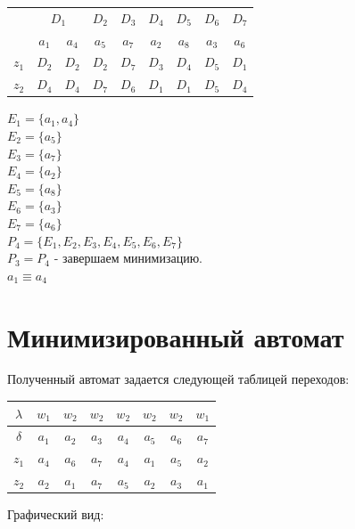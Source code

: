 \documentclass[12pt, a4paper]{article}
\begin{document}
\begin{tabular}{| c | c | c | c | c | c | c | c | c |}
  \hline
  \multirow{2}{*}{} & \multicolumn{2}{|c|}{$D_1$} & $D_2$ & $D_3$ & $D_4$ & $D_5$ & $D_6$ & $D_7$\\
  \cline{2-9}
  & $a_1$ & $a_4$ & $a_5$ & $a_7$ & $a_2$ & $a_8$ & $a_3$ & $a_6$\\
  \hline
  $z_1$ & $D_2$ & $D_2$ & $D_2$ & $D_7$ & $D_3$ & $D_4$ & $D_5$ & $D_1$\\
  \hline
  $z_2$ & $D_4$ & $D_4$ & $D_7$ & $D_6$ & $D_1$ & $D_1$ & $D_5$ & $D_4$\\
  \hline
\end{tabular}

\noindent
$E_1 = \{a_1, a_4\}$\\
$E_2 = \{a_5\}$\\
$E_3 = \{a_7\}$\\
$E_4 = \{a_2\}$\\
$E_5 = \{a_8\}$\\
$E_6 = \{a_3\}$\\
$E_7 = \{a_6\}$\\
$P_4 = \{E_1, E_2, E_3, E_4, E_5, E_6, E_7\}$\\
$P_3 = P_4$ - завершаем минимизацию.\\
$a_1 \equiv a_4$

\section*{Минимизированный автомат}

Полученный автомат задается следующей таблицей переходов:

\begin{center}
\begin{tabular}{| c | c | c | c | c | c | c | c |}
  \hline
  $\lambda$ & $w_1$ & $w_2$ & $w_2$ & $w_2$ & $w_2$ & $w_2$ & $w_1$\\
  \hline
  $\delta$ & $a_1$ & $a_2$ & $a_3$ & $a_4$ & $a_5$ & $a_6$ & $a_7$\\
  \hline
  $z_1$ & $a_4$ & $a_6$ & $a_7$ & $a_4$ & $a_1$ & $a_5$ & $a_2$\\
  \hline
  $z_2$ & $a_2$ & $a_1$ & $a_7$ & $a_5$ & $a_2$ & $a_3$ & $a_1$\\
  \hline
\end{tabular}
\end{center}

Графический вид:
\end{document}
